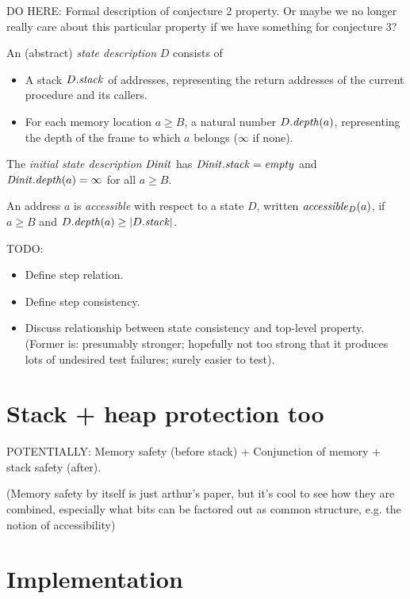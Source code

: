 \documentclass[conference]{IEEEtran}
\begin{document}
DO HERE: Formal description of conjecture 2 property.  Or maybe we no longer really care about this particular property if we have something for conjecture 3?

An (abstract) \emph{state description} $D$ consists of
\begin{itemize}
\item
  A stack ${D}.\relax{\it stack}$ of addresses, representing the return addresses of the current procedure and its callers.
\item
  For each memory location $a \geq B$, a natural number ${D}.\relax{\it depth}({a})$, representing the depth
  of the frame to which $a$ belongs ($\infty$ if none).
\end{itemize}

The \emph{initial state description} $\relax{\it Dinit}$ has ${\relax{\it Dinit}}.\relax{\it stack} = \relax{\it empty}$ and ${\relax{\it Dinit}}.\relax{\it depth}({a}) = \infty$ for all $a \geq B$.

An address $a$ is \emph{accessible} with respect to a state $D$, written $\relax{\it accessible}_{D}({a})$, if
$a \geq B$ and ${D}.\relax{\it depth}({a}) \geq \lvert{{D}.\relax{\it stack}}\rvert$.


TODO:
\begin{itemize}
\item
  Define step relation.
\item
  Define step consistency.
\item
  Discuss relationship between state consistency and top-level property.  (Former is: presumably stronger; hopefully not
  too strong that it produces lots of undesired test failures; surely easier to test).

\end{itemize}


\iftext
\section{Stack + heap protection too}

POTENTIALLY: Memory safety (before stack) + Conjunction of memory + stack
safety (after).

(Memory safety by itself is just arthur’s paper, but it’s cool to see how
they are combined, especially what bits can be factored out as common
structure, e.g. the notion of accessibility)
\fi

\section{Implementation}
\label{impl}
\end{document}
